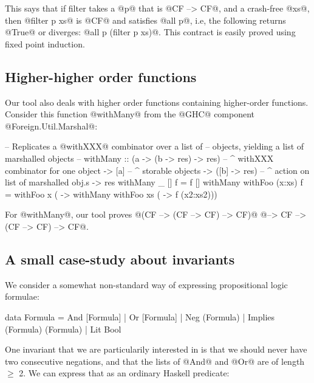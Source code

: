 This says that if filter takes a @p@ that is @CF --> CF@, and a
crash-free @xs@, then @filter p xs@ is @CF@ and satisfies @all p@,
i.e, the following returns @True@ or diverges:
@all p (filter p xs)@.
This contract is easily proved using fixed point induction.


\subsection{Higher-higher order functions}

Our tool also deals with higher order functions containing
higher-order functions. Consider this function @withMany@ from the
@GHC@ component @Foreign.Util.Marshal@:

\begin{code}
-- Replicates a @withXXX@ combinator over a list of
-- objects, yielding a list of marshalled objects
--
withMany :: (a -> (b -> res) -> res)
         -- ^ withXXX combinator for one object
         -> [a]
         -- ^ storable objects
         -> ([b] -> res)
         -- ^ action on list of marshalled obj.s
         -> res
withMany _       []     f = f []
withMany withFoo (x:xs) f = withFoo x ( ->
      withMany withFoo xs ( -> f (x2:xs2)))

\end{code}

For @withMany@, our tool proves
@(CF --> (CF --> CF) --> CF)@ @--> CF --> (CF --> CF) --> CF@.

\subsection{A small case-study about invariants}

We consider a somewhat non-standard way of expressing propositional
logic formulae:

\begin{code}
data Formula = And [Formula]
             | Or  [Formula]
             | Neg (Formula)
             | Implies (Formula) (Formula)
             | Lit Bool
\end{code}

One invariant that we are particularily interested in is that we
should never have two consecutive negations, and that the lists of
@And@ and @Or@ are of length $\ge$ 2. We can express that as an ordinary
Haskell predicate:

